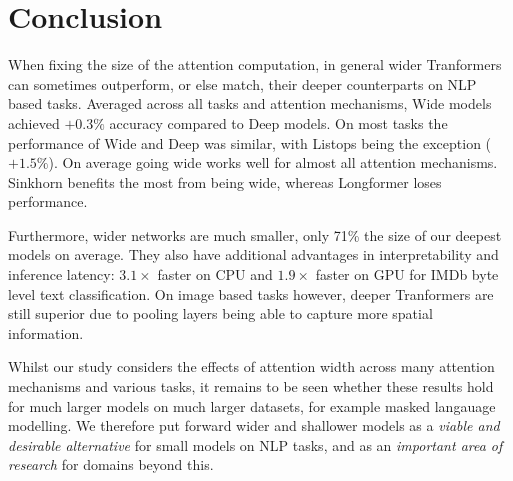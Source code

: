 \section{Conclusion}


When fixing the size of the attention computation, in general wider Tranformers can sometimes outperform, or else match, their deeper counterparts on NLP based tasks.
Averaged across all tasks and attention mechanisms, Wide models achieved $+0.3\%$ accuracy compared to Deep models.
On most tasks the performance of Wide and Deep was similar, with Listops being the exception ($+1.5\%$).
On average going wide works well for almost all attention mechanisms.
Sinkhorn benefits the most from being wide, whereas Longformer loses performance.

Furthermore, wider networks are much smaller, only 71\% the size of our deepest models on average.
They also have additional advantages in interpretability and inference latency: $3.1 \times$ faster on CPU and $1.9 \times$ faster on GPU for IMDb byte level text classification.
On image based tasks however, deeper Tranformers are still superior due to pooling layers being able to capture more spatial information.

Whilst our study considers the effects of attention width across many attention mechanisms and various tasks, it remains to be seen whether these results hold for much larger models on much larger datasets, for example masked langauage modelling.
We therefore put forward wider and shallower models as a \emph{viable and desirable alternative} for small models on NLP tasks, and as an \emph{important area of research} for domains beyond this.

